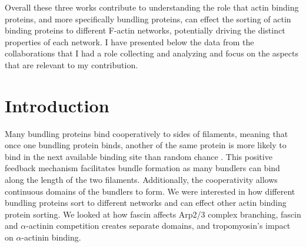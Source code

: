 Overall these three works contribute to understanding the role that actin binding proteins, and more specifically bundling proteins, can effect the sorting of actin binding proteins to different F-actin networks, potentially driving the distinct properties of each network. I have presented below the data from the collaborations that I had a role collecting and analyzing and focus on the aspects that are relevant to my contribution. 


\section{Introduction}\label{ch03-introduction}

Many bundling proteins bind cooperatively to sides of filaments, 
meaning that once one bundling protein binds, another of the same 
protein is more likely to bind in the next available binding site 
than random chance \citep{winkelman_fascin-_2016}. This positive 
feedback mechanism facilitates bundle formation as many bundlers can
bind along the length of the two filaments. Additionally, the cooperativity allows continuous domains of the bundlers to form. We were interested in how different bundling proteins sort to different networks and can effect other actin binding protein sorting. We looked at how fascin affects Arp2/3 complex branching, fascin and $\alpha$-actinin competition creates separate domains, and tropomyosin's impact on $\alpha$-actinin binding. 


